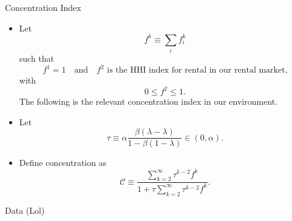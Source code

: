 \documentclass[10pt, xcolor=dvipsnames]{beamer}
\begin{document}
\begin{frame}{Concentration Index}
    \begin{itemize}
    \item Let 
\[
f^k \equiv \sum_i f_i^k
\]
such that 
\[
f^1 = 1
\quad \text{and} \quad 
f^2 \text{ is the HHI index for rental in our rental market,}
\]
with 
\[
0 \leq f^2 \leq 1.
\]
The following is the relevant concentration index in our environment.

        \item Let \begin{equation}
            \tau \equiv \alpha \frac{\beta(\lambda - \lambda)}{1 - \beta(1 - \lambda)} \in (0, \alpha).
        \end{equation}
        \item Define concentration as
            \begin{equation}
                \mathcal{C} \equiv \frac{\sum_{k=2}^{\infty} \tau^{k-2} f^k}{1 + \tau \sum_{k=2}^{\infty} \tau^{k-2} f^k}.
            \end{equation}

    \end{itemize}
\end{frame}

\begin{frame}{Data (Lol)}
    
\end{frame}
\end{document}
